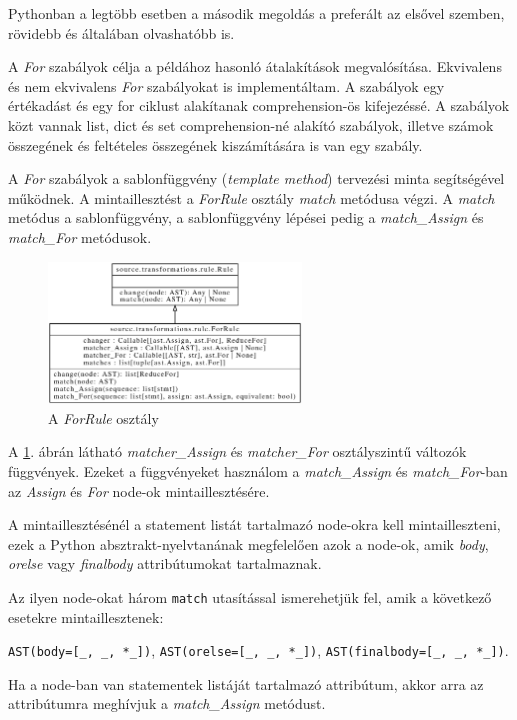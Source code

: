 Pythonban a legtöbb esetben a második megoldás a preferált az elsővel szemben,
rövidebb és általában olvashatóbb is.

A \emph{For} szabályok célja a példához hasonló átalakítások megvalósítása.
Ekvivalens és nem ekvivalens \emph{For} szabályokat is implementáltam.
A szabályok egy értékadást és egy for ciklust alakítanak comprehension-ös kifejezéssé.
A szabályok közt vannak list, dict és set comprehension-né alakító szabályok,
illetve számok összegének és feltételes összegének kiszámítására is van egy szabály.

A \emph{For} szabályok a sablonfüggvény (\emph{template method})
tervezési minta segítségével működnek.
A mintaillesztést a \emph{ForRule} osztály \emph{match} metódusa végzi.
A \emph{match} metódus a sablonfüggvény,
a sablonfüggvény lépései pedig
a \emph{match\_Assign} és \emph{match\_For} metódusok.

\begin{figure}[H]
	\centering
	\includegraphics[width=0.6\textwidth]{images/uml/ForRule.eps}
	\caption{\label{fig:ForRule}A \emph{ForRule} osztály}
\end{figure}

A \ref{fig:ForRule}. ábrán látható
\emph{matcher\_Assign} és \emph{matcher\_For} osztályszintű változók függvények.
Ezeket a függvényeket használom a
\emph{match\_Assign} és \emph{match\_For}-ban az \emph{Assign} és \emph{For}
node-ok mintaillesztésére.

A mintaillesztésénél a statement listát tartalmazó node-okra kell mintailleszteni,
ezek a Python absztrakt-nyelvtanának megfelelően azok a node-ok,
amik \emph{body}, \emph{orelse} vagy \emph{finalbody} attribútumokat tartalmaznak.

Az ilyen node-okat három \texttt{match} utasítással ismerehetjük fel,
amik a következő esetekre mintaillesztenek:

\lstinline{AST(body=[_, _, *_])},
\lstinline{AST(orelse=[_, _, *_])},
\lstinline{AST(finalbody=[_, _, *_])}.

Ha a node-ban van statementek listáját tartalmazó attribútum,
akkor arra az attribútumra meghívjuk a \emph{match\_Assign} metódust.

